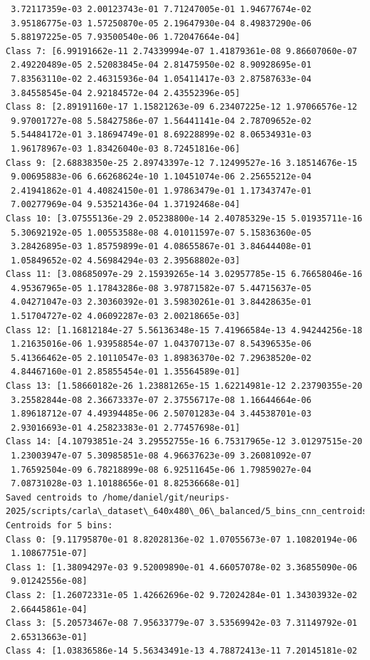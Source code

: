 \begin{verbatim}
 3.72117359e-03 2.00123743e-01 7.71247005e-01 1.94677674e-02
 3.95186775e-03 1.57250870e-05 2.19647930e-04 8.49837290e-06
 5.88197225e-05 7.93500540e-06 1.72047664e-04]
Class 7: [6.99191662e-11 2.74339994e-07 1.41879361e-08 9.86607060e-07
 2.49220489e-05 2.52083845e-04 2.81475950e-02 8.90928695e-01
 7.83563110e-02 2.46315936e-04 1.05411417e-03 2.87587633e-04
 3.84558545e-04 2.92184572e-04 2.43552396e-05]
Class 8: [2.89191160e-17 1.15821263e-09 6.23407225e-12 1.97066576e-12
 9.97001727e-08 5.58427586e-07 1.56441141e-04 2.78709652e-02
 5.54484172e-01 3.18694749e-01 8.69228899e-02 8.06534931e-03
 1.96178967e-03 1.83426040e-03 8.72451816e-06]
Class 9: [2.68838350e-25 2.89743397e-12 7.12499527e-16 3.18514676e-15
 9.00695883e-06 6.66268624e-10 1.10451074e-06 2.25655212e-04
 2.41941862e-01 4.40824150e-01 1.97863479e-01 1.17343747e-01
 7.00277969e-04 9.53521436e-04 1.37192468e-04]
Class 10: [3.07555136e-29 2.05238800e-14 2.40785329e-15 5.01935711e-16
 5.30692192e-05 1.00553588e-08 4.01011597e-07 5.15836360e-05
 3.28426895e-03 1.85759899e-01 4.08655867e-01 3.84644408e-01
 1.05849652e-02 4.56984294e-03 2.39568802e-03]
Class 11: [3.08685097e-29 2.15939265e-14 3.02957785e-15 6.76658046e-16
 4.95367965e-05 1.17843286e-08 3.97871582e-07 5.44715637e-05
 4.04271047e-03 2.30360392e-01 3.59830261e-01 3.84428635e-01
 1.51704727e-02 4.06092287e-03 2.00218665e-03]
Class 12: [1.16812184e-27 5.56136348e-15 7.41966584e-13 4.94244256e-18
 1.21635016e-06 1.93958854e-07 1.04370713e-07 8.54396535e-06
 5.41366462e-05 2.10110547e-03 1.89836370e-02 7.29638520e-02
 4.84467160e-01 2.85855454e-01 1.35564589e-01]
Class 13: [1.58660182e-26 1.23881265e-15 1.62214981e-12 2.23790355e-20
 3.25582844e-08 2.36673337e-07 2.37556717e-08 1.16644664e-06
 1.89618712e-07 4.49394485e-06 2.50701283e-04 3.44538701e-03
 2.93016693e-01 4.25823383e-01 2.77457698e-01]
Class 14: [4.10793851e-24 3.29552755e-16 6.75317965e-12 3.01297515e-20
 1.23003947e-07 5.30985851e-08 4.96637623e-09 3.26081092e-07
 1.76592504e-09 6.78218899e-08 6.92511645e-06 1.79859027e-04
 7.08731028e-03 1.10188656e-01 8.82536668e-01]
Saved centroids to /home/daniel/git/neurips-2025/scripts/carla\_dataset\_640x480\_06\_balanced/5_bins_cnn_centroids\_balanced.npy
Centroids for 5 bins:
Class 0: [9.11795870e-01 8.82028136e-02 1.07055673e-07 1.10820194e-06
 1.10867751e-07]
Class 1: [1.38094297e-03 9.52009890e-01 4.66057078e-02 3.36855090e-06
 9.01242556e-08]
Class 2: [1.26072331e-05 1.42662696e-02 9.72024284e-01 1.34303932e-02
 2.66445861e-04]
Class 3: [5.20573467e-08 7.95633779e-07 3.53569942e-03 7.31149792e-01
 2.65313663e-01]
Class 4: [1.03836586e-14 5.56343491e-13 4.78872413e-11 7.20145181e-02

\end{verbatim}
